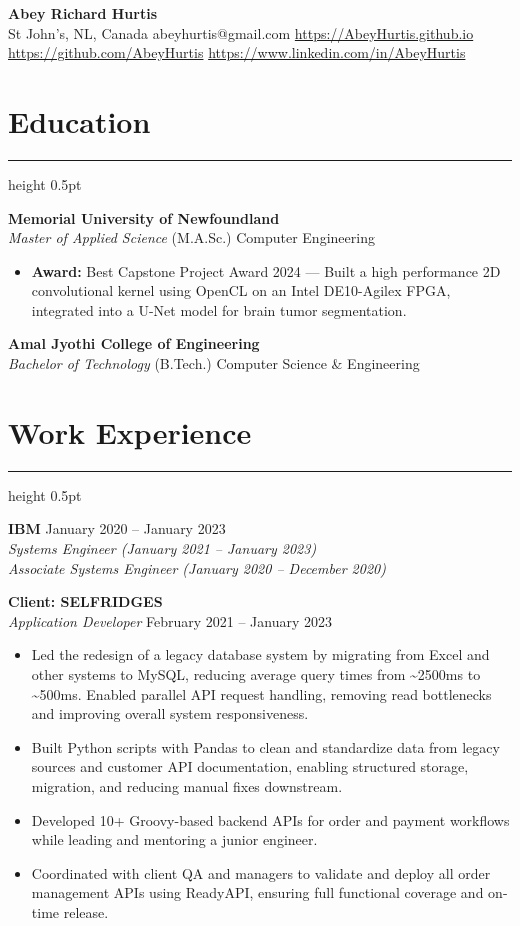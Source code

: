 \documentclass[a4paper]{article}
\newcommand{\tightsection}[1]{
  \vspace{-0.9em}
  \section*{#1}
  \vspace{-0.95em}
  {\color{gray}\hrule height 0.5pt}
  \vspace{0.5em}
}
\begin{document}
\fontsize{10.6pt}{10.4pt}\selectfont
\begin{center}
    {\LARGE \textbf{Abey Richard Hurtis}} \\
    St John’s, NL, Canada \textbar abeyhurtis@gmail.com 
    \textbar\href{https://AbeyHurtis.github.io}{https://AbeyHurtis.github.io}
    \textbar \href{https://github.com/AbeyHurtis}{https://github.com/AbeyHurtis} \textbar  \href{https://www.linkedin.com/in/AbeyHurtis}{https://www.linkedin.com/in/AbeyHurtis}
\end{center}


\tightsection{Education}
\textbf{Memorial University of Newfoundland} \\
\textit{Master of Applied Science} (M.A.Sc.) Computer Engineering 
\begin{itemize}
    \item \textbf{Award:} Best Capstone Project Award 2024 — Built a high performance 2D convolutional kernel using OpenCL on an Intel DE10-Agilex FPGA, integrated into a U-Net model for brain tumor segmentation.
\end{itemize}


\noindent\textbf{Amal Jyothi College of Engineering} \\
\textit{Bachelor of Technology} (B.Tech.) Computer Science \& Engineering 

\tightsection{Work Experience}

\textbf{IBM} \hfill January 2020 -- January 2023 \\
\textit{Systems Engineer (January 2021 -- January 2023)} \\
\textit{Associate Systems Engineer (January 2020 -- December 2020)} 

\vspace{0.5em}
\noindent
\textbf{Client: SELFRIDGES} \\
\textit{Application Developer} \hfill February 2021 -- January 2023  
\begin{itemize}[itemsep=1pt, topsep=1pt, parsep=0pt, partopsep=0pt]
    \item Led the redesign of a legacy database system by migrating from Excel and other systems to MySQL, reducing average query times from \textasciitilde2500ms to \textasciitilde500ms. Enabled parallel API request handling, removing read bottlenecks and improving overall system responsiveness.
    \item Built Python scripts with Pandas to clean and standardize data from legacy sources and customer API documentation, enabling structured storage, migration, and reducing manual fixes downstream.
    \item Developed 10+ Groovy-based backend APIs for order and payment workflows while leading and mentoring a junior engineer.
    \item Coordinated with client QA and managers to validate and deploy all order management APIs using ReadyAPI, ensuring full functional coverage and on-time release.
\end{itemize}
\end{document}
